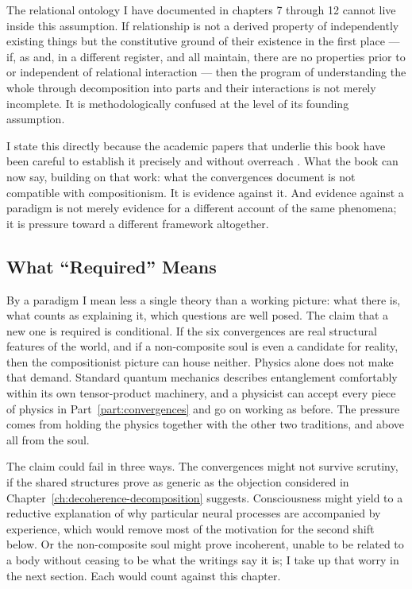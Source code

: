 The relational ontology I have documented in chapters 7 through 12 cannot live
inside this assumption. If relationship is not a derived property of
independently existing things but the constitutive ground of their existence in
the first place --- if, as \citet{Rovelli1996} and, in a different register,
\citeauthor{Whitehead1929} \citeyearpar{Whitehead1929} and \AbdulBaha all
maintain, there are no properties prior to or independent of relational
interaction --- then the program of understanding the whole through
decomposition into parts and their interactions is not merely incomplete. It is
methodologically confused at the level of its founding assumption.

I state this directly because the academic papers that underlie this book have
been careful to establish it precisely and without overreach
\citep{AdamsRCT,AdamsThreePaths,AdamsMahabbat}. What the book can now say, building
on that work: what the convergences document is not compatible with
compositionism. It is evidence against it. And evidence against a paradigm is not merely
evidence for a different account of the same phenomena; it is pressure toward a
different framework altogether.

\subsection*{What ``Required'' Means}

By a paradigm I mean less a single theory than a working picture: what there
is, what counts as explaining it, which questions are well posed. The claim that
a new one is required is conditional. If the six convergences are real
structural features of the world, and if a non-composite soul is even a
candidate for reality, then the compositionist picture can house neither.
Physics alone does not make that demand. Standard quantum mechanics describes
entanglement comfortably within its own tensor-product machinery, and a
physicist can accept every piece of physics in Part~\ref{part:convergences} and
go on working as before. The pressure comes from holding the physics together
with the other two traditions, and above all from the soul.

The claim could fail in three ways. The convergences might not survive
scrutiny, if the shared structures prove as generic as the objection considered
in Chapter~\ref{ch:decoherence-decomposition} suggests. Consciousness might
yield to a reductive explanation of why particular neural processes are
accompanied by experience, which would remove most of the motivation for the
second shift below. Or the non-composite soul might prove incoherent, unable to
be related to a body without ceasing to be what the writings say it is; I take
up that worry in the next section. Each would count against this chapter.


